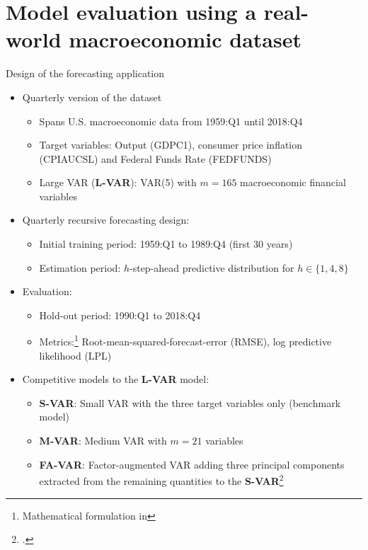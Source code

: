 
\section{Model evaluation using a real-world macroeconomic dataset}

\begin{frame}{Design of the forecasting application}
    \begin{itemize}
        \item Quarterly version of the \cite{mccracken_fred-md_2015} dataset
            \begin{itemize}
                \item Spans U.S. macroeconomic data from 1959:Q1 until 2018:Q4
                \item Target variables: Output (GDPC1), consumer price inflation (CPIAUCSL) and Federal Funds Rate (FEDFUNDS)
                \item Large VAR (\textbf{L-VAR}): VAR(5) with $m = 165$ macroeconomic financial variables
            \end{itemize}
        \item Quarterly recursive forecasting design:
            \begin{itemize}
                \item Initial training period: 1959:Q1 to 1989:Q4 (first 30 years)
                \item Estimation period: $h$-step-ahead predictive distribution for $h \in \{ 1 , 4 , 8 \}$
            \end{itemize}
        \item Evaluation:
            \begin{itemize}
                \item Hold-out period: 1990:Q1 to 2018:Q4
                \item Metrics:\footnote{Mathematical formulation in } Root-mean-squared-forecast-error (RMSE), log predictive likelihood (LPL)
            \end{itemize}
        \item Competitive models to the \textbf{L-VAR} model:
            \begin{itemize}
                \item \textbf{S-VAR}: Small VAR with the three target variables only (benchmark model)
                \item \textbf{M-VAR}: Medium VAR with $m = 21$ variables
                \item \textbf{FA-VAR}: Factor-augmented VAR adding three principal components extracted from the remaining quantities to the \textbf{S-VAR}\footcite{banbura_large_2010,koop_forecasting_2013}
            \end{itemize}
    \end{itemize}
\end{frame}

